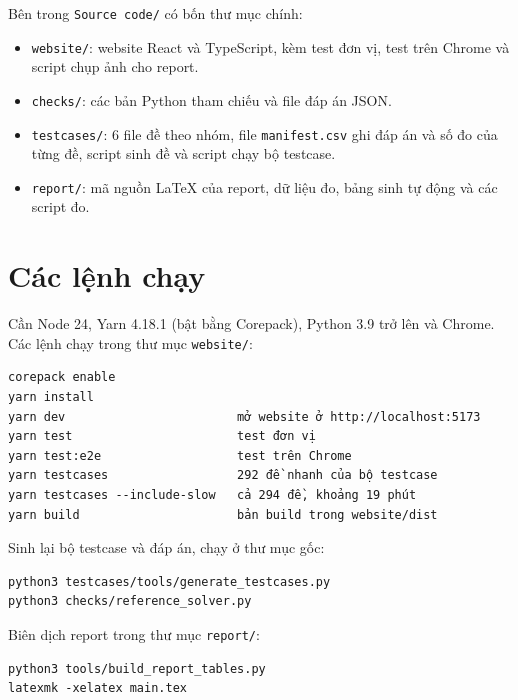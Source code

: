 Bên trong \texttt{Source code/} có bốn thư mục chính:

\begin{itemize}
  \item \texttt{website/}: website React và TypeScript, kèm test đơn vị, test trên Chrome và script chụp ảnh cho report.
  \item \texttt{checks/}: các bản Python tham chiếu và file đáp án JSON.
  \item \texttt{testcases/}: 6 file đề theo nhóm, file \texttt{manifest.csv} ghi đáp án và số đo của từng đề, script sinh đề và script chạy bộ testcase.
  \item \texttt{report/}: mã nguồn LaTeX của report, dữ liệu đo, bảng sinh tự động và các script đo.
\end{itemize}

\section{Các lệnh chạy}

Cần Node 24, Yarn 4.18.1 (bật bằng Corepack), Python 3.9 trở lên và Chrome. Các lệnh chạy trong thư mục \texttt{website/}:

\begin{Verbatim}[frame=single, fontsize=\small]
corepack enable
yarn install
yarn dev                        mở website ở http://localhost:5173
yarn test                       test đơn vị
yarn test:e2e                   test trên Chrome
yarn testcases                  292 đề nhanh của bộ testcase
yarn testcases --include-slow   cả 294 đề, khoảng 19 phút
yarn build                      bản build trong website/dist
\end{Verbatim}

Sinh lại bộ testcase và đáp án, chạy ở thư mục gốc:

\begin{Verbatim}[frame=single, fontsize=\small]
python3 testcases/tools/generate_testcases.py
python3 checks/reference_solver.py
\end{Verbatim}

Biên dịch report trong thư mục \texttt{report/}:

\begin{Verbatim}[frame=single, fontsize=\small]
python3 tools/build_report_tables.py
latexmk -xelatex main.tex
\end{Verbatim}
